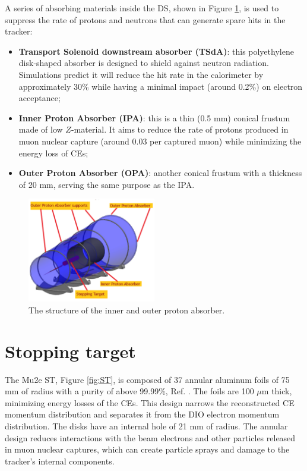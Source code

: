 A series of absorbing materials inside the DS, shown in 
Figure \ref{fig:absorbersDS}, is used to suppress 
the rate of protons and neutrons that can generate spare hits in the 
tracker:
\begin{itemize}
    \item \textbf{Transport Solenoid downstream absorber (TSdA)}: this 
    polyethylene disk-shaped absorber is designed to shield against neutron radiation. 
    Simulations predict it will reduce the hit rate in the calorimeter by approximately 30\% 
    while having a minimal impact (around 0.2\%) on electron acceptance;
    \item \textbf{Inner Proton Absorber (IPA)}: this is a thin (0.5 mm) conical 
    frustum made of low $Z$-material. It aims to reduce the rate of protons produced 
    in muon nuclear capture (around 0.03 per captured muon) while minimizing the 
    energy loss of CEs;
    \item \textbf{Outer Proton Absorber (OPA)}: another conical frustum with a 
    thickness of 20 mm, serving the same purpose as the IPA.
\end{itemize}
\begin{figure}[!h]
    \centering
    \includegraphics[width =0.5\textwidth]{figures/png/Screenshot_20240706_132949.png}
    \caption[The structure of the inner and outer proton absorber.]{The structure of the inner and outer proton absorber.}
    \label{fig:absorbersDS}
    \end{figure}




\section{Stopping target}
The Mu2e ST, Figure \ref{fig:ST}, is 
composed of 37 annular aluminum foils of 75 mm of radius with a purity of 
above 99.99\%, Ref. \cite{bobbb}. The foils are 100 $\mu$m thick, 
minimizing energy losses of the CEs. This design 
narrows the reconstructed CE momentum distribution 
and separates it from the DIO electron momentum distribution. 
The disks have an internal hole of 21 mm of radius.
The annular design reduces interactions with the beam electrons
{\red and other particles released in muon nuclear captures, which can create 
  particle sprays and damage to the tracker's internal components.}

